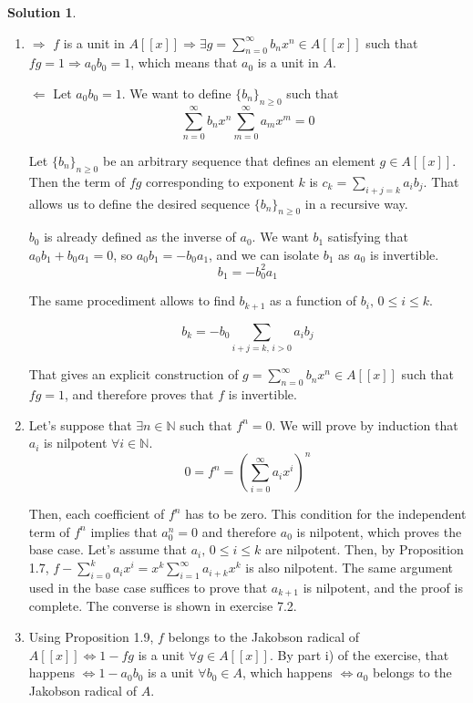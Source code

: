\documentclass[12pt]{article}
\newcommand{\N}{\ensuremath{\mathbb{N}}}
\newcommand{\imp}{\ensuremath{\Rightarrow}}
\theoremstyle{definition}
\newtheorem*{sol}{Solution}
\begin{document}
\begin{sol}
	\begin{enumerate}[label=(\roman*)]
		\item $\boxed{\Rightarrow}$ $f$ is a unit in $A[[x]] \imp \exists g = \sum\limits_{n = 0}^{\infty} b_nx^n \in A[[x]]$ such that $fg = 1 \imp a_0 b_0 = 1$, which means that $a_0$ is a unit in $A$. 
		
		$\boxed{\Leftarrow}$ Let $a_0 b_0 = 1$. We want to define $\{b_n\}_{n \geq 0}$ such that 
		\[
			\sum\limits_{n = 0}^{\infty} b_nx^n \sum\limits_{m = 0}^{\infty} a_mx^m = 0
		\]

		Let $\{b_n\}_{n \geq 0}$ be an arbitrary sequence that defines an element $g \in A[[x]]$. Then the term of $fg$ corresponding to exponent $k$ is $c_k = \sum_{i+j = k} a_i b_j$. That allows us to define the desired sequence $\{b_n\}_{n \geq 0}$ in a recursive way. 

		$b_0$ is already defined as the inverse of $a_0$. We want $b_1$ satisfying that $a_0 b_1 + b_0 a_1 = 0$, so $a_0 b_1 = -b_0 a_1$, and we can isolate $b_1$ as $a_0$ is invertible.
		\[
			b_1 = -b_0^2 a_1
		\]

		The same procediment allows to find $b_{k+1}$ as a function of $b_i, \, 0\leq i\leq k$. 

		\[
			b_k = -b_0\sum_{i+j = k, \, i>0} a_i b_j
		\]

		That gives an explicit construction of $g = \sum\limits_{n = 0}^{\infty} b_nx^n \in A[[x]]$ such that $fg = 1$, and therefore proves that $f$ is invertible.

		\item Let's suppose that $\exists n \in \N$ such that $f^n = 0$. We will prove by induction that $a_i$ is nilpotent $\forall i \in \N$.
		\[
			0 = f^n =  \left ( \sum_{i = 0}^\infty a_i x^i \right )^n
		\]

		Then, each coefficient of $f^n$ has to be zero. This condition for the independent term of $f^n$ implies that $a_0^n = 0$ and therefore $a_0$ is nilpotent, which proves the base case. Let's assume that $a_i, \, 0 \leq i \leq k$ are nilpotent. Then, by Proposition 1.7, $f-\sum_{i = 0}^k a_i x^i = x^{k}\sum_{i = 1}^\infty a_{i+k} x^k$ is also nilpotent. The same argument used in the base case suffices to prove that $a_{k+1}$ is nilpotent, and the proof is complete. The converse is shown in exercise 7.2.

		\item Using Proposition 1.9, $f$ belongs to the Jakobson radical of $A[[x]] \iff 1-fg$ is a unit $\forall g \in A[[x]]$. By part i) of the exercise, that happens $\iff 1-a_0b_0$ is a unit $\forall b_0 \in A$, which happens $\iff a_0$ belongs to the Jakobson radical of $A$.


\end{enumerate}
\end{sol}
\end{document}
